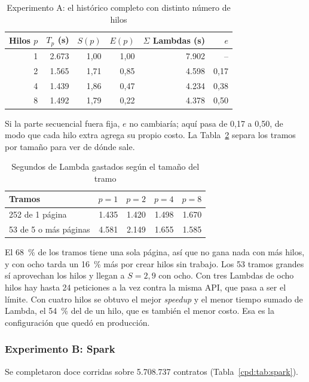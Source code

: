 \begin{table}[!htbp]
\caption{Experimento A: el histórico completo con distinto número de hilos}
\label{cpd:tab:mp}
\centering
\begin{tabular}{@{}rrrrrr@{}}
\toprule
Hilos $p$ & $T_p$ (s) & $S(p)$ & $E(p)$ & $\Sigma$ Lambdas (s) & $e$ \\
\midrule
1 & 2.673 & 1,00 & 1,00 & 7.902 & -- \\
2 & 1.565 & 1,71 & 0,85 & 4.598 & 0,17 \\
4 & 1.439 & 1,86 & 0,47 & 4.234 & 0,38 \\
8 & 1.492 & 1,79 & 0,22 & 4.378 & 0,50 \\
\bottomrule
\end{tabular}
\end{table}

Si la parte secuencial fuera fija, $e$ no cambiaría; aquí pasa de 0,17 a 0,50, de modo que cada hilo extra agrega su propio costo. La Tabla~\ref{cpd:tab:granularidad} separa los tramos por tamaño para ver de dónde sale.

\begin{table}[!htbp]
\caption{Segundos de Lambda gastados según el tamaño del tramo}
\label{cpd:tab:granularidad}
\centering
\begin{tabular}{@{}lrrrr@{}}
\toprule
Tramos & $p=1$ & $p=2$ & $p=4$ & $p=8$ \\
\midrule
252 de 1 página & 1.435 & 1.420 & 1.498 & 1.670 \\
53 de 5 o más páginas & 4.581 & 2.149 & 1.655 & 1.585 \\
\bottomrule
\end{tabular}
\end{table}

El 68~\% de los tramos tiene una sola página, así que no gana nada con más hilos, y con ocho tarda un 16~\% más por crear hilos sin trabajo. Los 53 tramos grandes sí aprovechan los hilos y llegan a $S = 2{,}9$ con ocho. Con tres Lambdas de ocho hilos hay hasta 24 peticiones a la vez contra la misma API, que pasa a ser el límite. Con cuatro hilos se obtuvo el mejor \textit{speedup} y el menor tiempo sumado de Lambda, el 54~\% del de un hilo, que es también el menor costo. Esa es la configuración que quedó en producción.

\subsubsection{Experimento B: Spark}
Se completaron doce corridas sobre 5.708.737 contratos (Tabla~\ref{cpd:tab:spark}).

